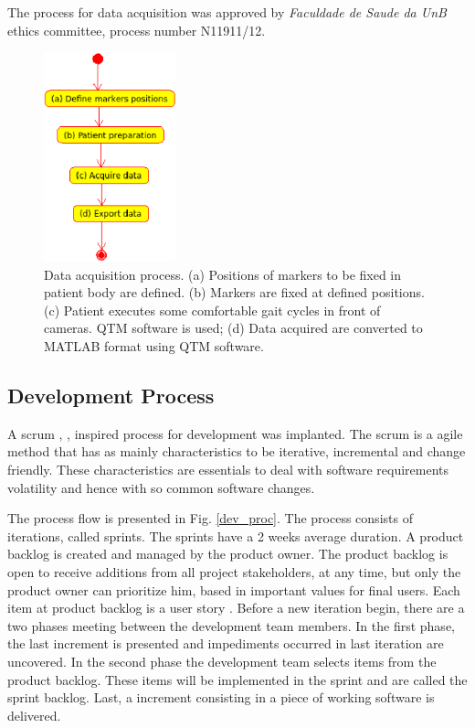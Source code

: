 \documentclass[journal]{IEEEtran}
\begin{document}
The process for data acquisition was approved by 
\emph{Faculdade de Saude da UnB} ethics committee, 
process number N11911/12.

\begin{figure}[!t]
	\centering
	\includegraphics[width=1.5in]{img/data_acq_proc.eps}
	\caption{Data acquisition process.
		(a) Positions of markers to be fixed in patient body are defined.
		(b) Markers are fixed at defined positions.
		(c) Patient executes some comfortable gait cycles in front of cameras.
		QTM software is used;
		(d) Data acquired are converted to MATLAB format using QTM software.
	}
	\label{data_acq_proc}
\end{figure}


\subsection{Development Process}

A scrum \cite{Schwaber2001}, \cite{Schwaber2004}, \cite{Rubin2012} inspired process for development was implanted.
The scrum is a agile method \cite{Beck2001} that has as mainly characteristics
to be iterative, incremental and change friendly.
These characteristics are essentials to deal with software requirements volatility
and hence with so common software changes.

The process flow is presented in Fig. \ref{dev_proc}.
The process consists of iterations, called sprints.
The sprints have a 2 weeks average duration.
A product backlog is created and managed by the product owner.
The product backlog is open to receive additions from all 
project stakeholders, at any time, but only the product owner can prioritize him,
based in important values for final users.
Each item at product backlog is a user story \cite{cohn2004}.
Before a new iteration begin, there are a two phases meeting between the development team members. 
In the first phase, the last increment is presented and impediments occurred in last iteration are uncovered.
In the second phase the development team selects items from the product backlog.
These items will be implemented in the sprint and are called the sprint backlog.
Last, a increment consisting in a piece of working software is delivered.
\end{document}

